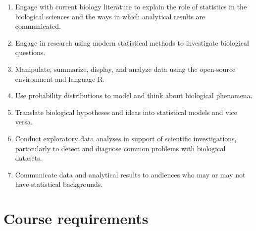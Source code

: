 \documentclass[
  13,
  letterpaper,
]{report}
\providecommand{\tightlist}{%
  \setlength{\itemsep}{0pt}\setlength{\parskip}{0pt}}
\begin{document}
\begin{enumerate}
\def\labelenumi{\arabic{enumi}.}
\tightlist
\item
  Engage with current biology literature to explain the role of
  statistics in the biological sciences and the ways in which analytical
  results are communicated.
\item
  Engage in research using modern statistical methods to investigate
  biological questions.
\item
  Manipulate, summarize, display, and analyze data using the open-source
  environment and language R.
\item
  Use probability distributions to model and think about biological
  phenomena.
\item
  Translate biological hypotheses and ideas into statistical models and
  vice versa.
\item
  Conduct exploratory data analyses in support of scientific
  investigations, particularly to detect and diagnose common problems
  with biological datasets.
\item
  Communicate data and analytical results to audiences who may or may
  not have statistical backgrounds.
\end{enumerate}

\section*{Course requirements}\label{course-requirements}

\end{document}
